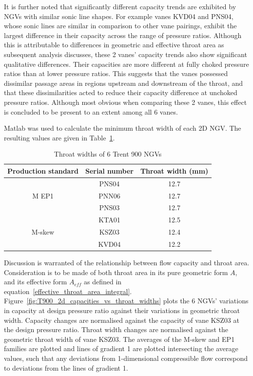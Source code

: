 \documentclass[a4paper, 11pt, oneside]{report}
\begin{document}
It is further noted that significantly different capacity trends are exhibited by NGVs with similar sonic line shapes. For example vanes KVD04 and PNS04, whose sonic lines are similar in comparison to other vane pairings, exhibit the largest difference in their capacity across the range of pressure ratios. Although this is attributable to differences in geometric and effective throat area as subsequent analysis discusses, these 2 vanes' capacity trends  also show significant qualitative differences. Their capacities are more different at fully choked pressure ratios than at lower pressure ratios. This suggests that the vanes possessed dissimilar passage areas in regions upstream and downstream of the throat, and that these dissimilarities acted to reduce their capacity difference at unchoked pressure ratios. Although most obvious when comparing these 2 vanes, this effect is concluded to be present to an extent among all 6 vanes.

Matlab was used to calculate the minimum throat width of each 2D NGV. The resulting values are given in Table~\ref{T900_throat_widths}.

\begin{table}[H]
\caption{Throat widths of 6 Trent 900 NGVs}
\label{T900_throat_widths}
\begin{center}
\begin{tabular}{|c|c|c|}
\hline
Production standard & Serial number & Throat width (mm)\\
\hline
\multirow{3}{*}{M EP1} & PNS04 & 12.7\\
 & PNN06 & 12.7\\
 & PNS03 & 12.7\\
\hline
\multirow{3}{*}{M-skew} & KTA01 & 12.5\\
 & KSZ03 & 12.4\\
 & KVD04 & 12.2\\
\hline
\end{tabular}
\end{center}
\end{table}

Discussion is warranted of the relationship between flow capacity and throat area. Consideration is to be made of both throat area in its pure geometric form $A$, and its effective form $A_{eff}$ as defined in equation~\ref{effective_throat_area_integral}. Figure~\ref{fig:T900_2d_capacities_vs_throat_widths} plots the 6 NGVs' variations in capacity at design pressure ratio against their variations in geometric throat width. Capacity changes are normalised against the capacity of vane KSZ03 at the design pressure ratio. Throat width changes are normalised against the geometric throat width of vane KSZ03. The averages of the M-skew and EP1 families are plotted and lines of gradient 1 are plotted intersecting the average values, such that any deviations from 1-dimensional compressible flow correspond to deviations from the lines of gradient 1.
\end{document}
